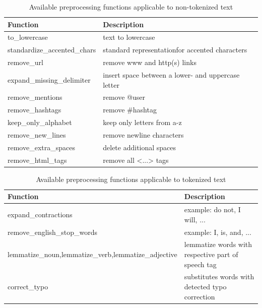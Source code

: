 \documentclass[11pt]{article}
\begin{document}
\begin{table}[ht]
\centering
\begin{adjustbox}{width=0.5\textwidth}
\begin{tabular}{p{}p{}}
\hline
\textbf{Function} & \textbf{Description}\\
\hline
to\_lowercase &  text to lowercase \\ 
standardize\_accented\_chars & standard representation\newline for accented characters \\
remove\_url & remove www and http(s) links \\ 
expand\_missing\_delimiter & insert space between a lower- and uppercase letter \\ 
remove\_mentions & remove @user \\
remove\_hashtags & remove \#hashtag  \\ 
keep\_only\_alphabet & keep only letters from a-z \\
remove\_new\_lines & remove newline characters \\
remove\_extra\_spaces & delete additional spaces \\
remove\_html\_tags & remove all <...> tags \\\hline
\end{tabular}
\end{adjustbox}
\caption{Available preprocessing functions applicable to non-tokenized text}
\label{tab:pre_func_non_tok}
\end{table}

\begin{table}[ht]
\centering
\begin{adjustbox}{width=0.5\textwidth}
\begin{tabular}{p{}p{}}
\hline
\textbf{Function} & \textbf{Description}\\
\hline
expand\_contractions & example: do not, I will, ... \\ 
remove\_english\_stop\_words & example: I, is, and, ... \\ 
lemmatize\_noun,\newline lemmatize\_verb,\newline lemmatize\_adjective & lemmatize words with respective part of speech tag \\ 
correct\_typo & substitutes words with detected typo correction \\
\hline
\end{tabular}
\end{adjustbox}
\caption{Available preprocessing functions applicable to tokenized text}
\label{tab:pre_func_tok}
\end{table}
\end{document}
